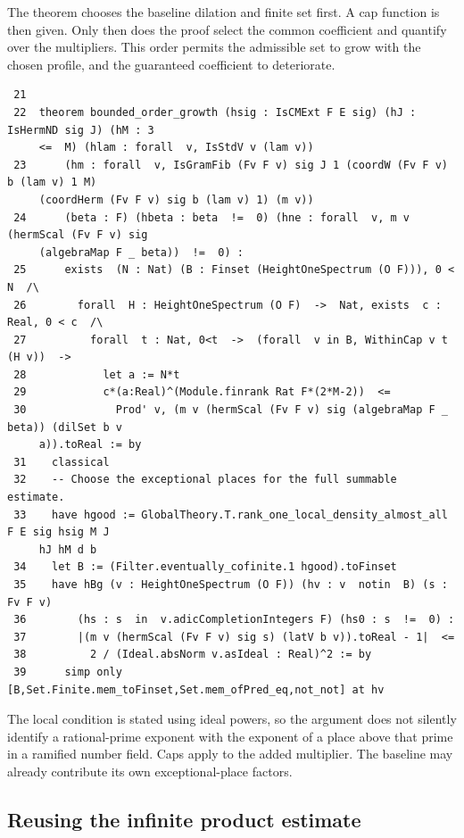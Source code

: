 \documentclass[12pt,letterpaper]{article}
\begin{document}
The theorem chooses the baseline dilation and finite set first. A cap function is then given. Only then does the proof select the common coefficient and quantify over the multipliers. This order permits the admissible set to grow with the chosen profile, and the guaranteed coefficient to deteriorate.
\par
{\fontsize{9.2}{11.2}\selectfont\begin{verbatim}
 21
 22  theorem bounded_order_growth (hsig : IsCMExt F E sig) (hJ : IsHermND sig J) (hM : 3
     <=  M) (hlam : forall  v, IsStdV v (lam v))
 23      (hm : forall  v, IsGramFib (Fv F v) sig J 1 (coordW (Fv F v) b (lam v) 1 M)
     (coordHerm (Fv F v) sig b (lam v) 1) (m v))
 24      (beta : F) (hbeta : beta  !=  0) (hne : forall  v, m v (hermScal (Fv F v) sig
     (algebraMap F _ beta))  !=  0) :
 25      exists  (N : Nat) (B : Finset (HeightOneSpectrum (O F))), 0 < N  /\
 26        forall  H : HeightOneSpectrum (O F)  ->  Nat, exists  c : Real, 0 < c  /\
 27          forall  t : Nat, 0<t  ->  (forall  v in B, WithinCap v t (H v))  ->
 28            let a := N*t
 29            c*(a:Real)^(Module.finrank Rat F*(2*M-2))  <=
 30              Prod' v, (m v (hermScal (Fv F v) sig (algebraMap F _ beta)) (dilSet b v
     a)).toReal := by
 31    classical
 32    -- Choose the exceptional places for the full summable estimate.
 33    have hgood := GlobalTheory.T.rank_one_local_density_almost_all F E sig hsig M J
     hJ hM d b
 34    let B := (Filter.eventually_cofinite.1 hgood).toFinset
 35    have hBg (v : HeightOneSpectrum (O F)) (hv : v  notin  B) (s : Fv F v)
 36        (hs : s  in  v.adicCompletionIntegers F) (hs0 : s  !=  0) :
 37        |(m v (hermScal (Fv F v) sig s) (latV b v)).toReal - 1|  <=
 38          2 / (Ideal.absNorm v.asIdeal : Real)^2 := by
 39      simp only [B,Set.Finite.mem_toFinset,Set.mem_ofPred_eq,not_not] at hv
\end{verbatim}}
The local condition is stated using ideal powers, so the argument does not silently identify a rational-prime exponent with the exponent of a place above that prime in a ramified number field. Caps apply to the added multiplier. The baseline may already contribute its own exceptional-place factors.
\clearpage{}\subsection*{Reusing the infinite product estimate}\label{extract-CappedGrowth89}
\end{document}
